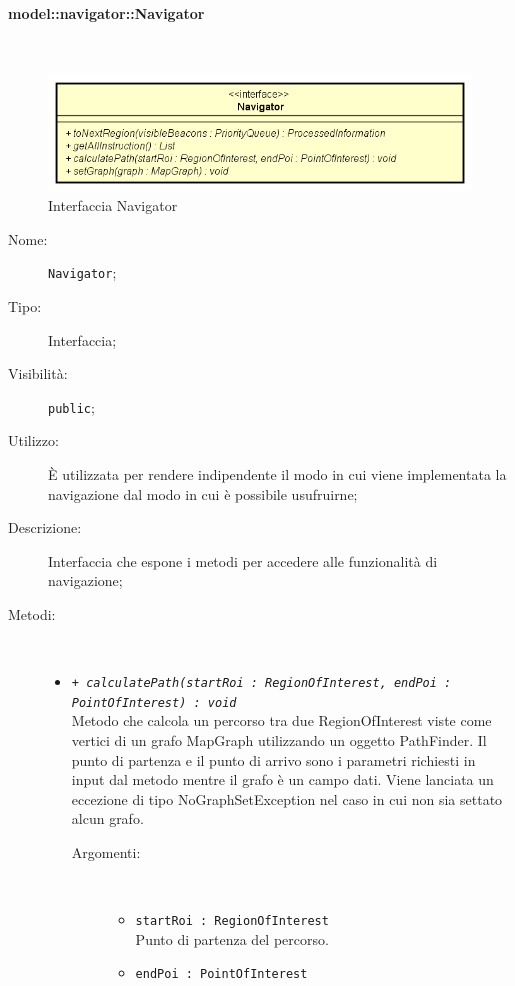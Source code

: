 \documentclass[../DefinizioneDiProdotto.tex]{subfiles}
\begin{document}
\paragraph{model::navigator::Navigator}
\
\begin{figure}[H]
	\centering
	\includegraphics[width=\maxwidth]{img/Navigator.png}
	\caption{Interfaccia Navigator}\label{fig:model::navigator::Navigator} 
\end{figure}
\begin{description}
	\item[Nome:] \texttt{Navigator};
	\item[Tipo:] Interfaccia;
	\item[Visibilità:] \texttt{public};
	\item[Utilizzo:] È utilizzata per rendere indipendente il modo in cui viene implementata la navigazione dal modo in cui è possibile usufruirne;
	\item[Descrizione:] Interfaccia che espone i metodi per accedere alle funzionalità di navigazione;
	\item[Metodi:] \
	\begin{itemize}
		\item \texttt{+ \textit{calculatePath(startRoi : RegionOfInterest, endPoi :\\ PointOfInterest) : void}}\\
		Metodo che calcola un percorso tra due RegionOfInterest viste come vertici di un grafo MapGraph utilizzando un oggetto PathFinder. Il punto di partenza e il punto di arrivo sono i parametri richiesti in input dal metodo mentre il grafo è un campo dati. Viene lanciata un eccezione di tipo NoGraphSetException nel caso in cui non sia settato alcun grafo.
		\begin{description}
			\item[Argomenti:] \
			\begin{itemize}
				\item \texttt{startRoi : RegionOfInterest}\\
				Punto di partenza del percorso.\item \texttt{endPoi : PointOfInterest}\\

\end{itemize}
\end{description}
\end{itemize}
\end{description}
\end{document}
